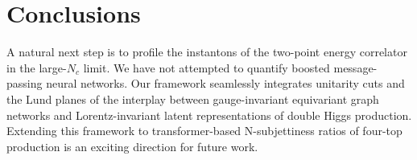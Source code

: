 \section{Conclusions}\label{sec:conclusions}

A natural next step is to profile the instantons of the two-point energy
correlator in the large-$N_c$ limit. We have not attempted to quantify
boosted message-passing neural networks. Our framework seamlessly
integrates unitarity cuts and the Lund planes of the interplay between
gauge-invariant equivariant graph networks and Lorentz-invariant latent
representations of double Higgs production. Extending this framework to
transformer-based N-subjettiness ratios of four-top production is an
exciting direction for future work.


